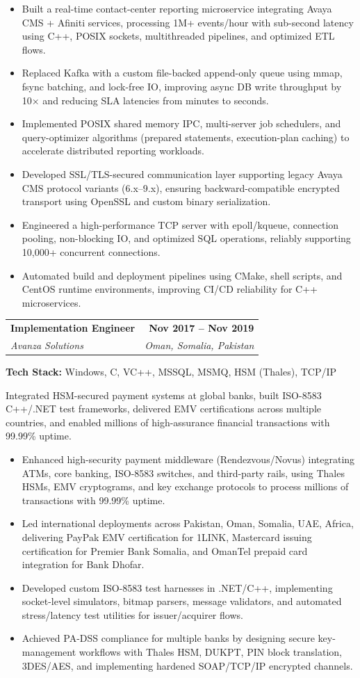 \documentclass[letterpaper,11pt]{article}
\makeatletter
\newcommand{\resumeItem}[1]{
  \item\small{
    {#1 \vspace{-2pt}}
  }
}
\newcommand{\resumeJobHeading}[4]{
  \vspace{-2pt}\item
    \begin{tabular*}{0.97\textwidth}[t]{l@{\extracolsep{\fill}}r}
      \textbf{#1} & \textbf{#2} \\
      \textit{\small#3} & \textit{\small #4} \\
    \end{tabular*}\vspace{5pt}
}
\newcommand{\resumeItemListStart}{\begin{itemize}}
\newcommand{\resumeItemListEnd}{\end{itemize}\vspace{-5pt}}
\makeatother
\begin{document}
      \resumeItemListStart
        \resumeItem{Built a real-time contact-center reporting microservice integrating Avaya CMS + Afiniti services, processing 1M+ events/hour with sub-second latency using C++, POSIX sockets, multithreaded pipelines, and optimized ETL flows.}
        \resumeItem{Replaced Kafka with a custom file-backed append-only queue using mmap, fsync batching, and lock-free IO, improving async DB write throughput by 10× and reducing SLA latencies from minutes to seconds.}
        \resumeItem{Implemented POSIX shared memory IPC, multi-server job schedulers, and query-optimizer algorithms (prepared statements, execution-plan caching) to accelerate distributed reporting workloads.}
        \resumeItem{Developed SSL/TLS-secured communication layer supporting legacy Avaya CMS protocol variants (6.x–9.x), ensuring backward-compatible encrypted transport using OpenSSL and custom binary serialization.}
        \resumeItem{Engineered a high-performance TCP server with epoll/kqueue, connection pooling, non-blocking IO, and optimized SQL operations, reliably supporting 10,000+ concurrent connections.}
        \resumeItem{Automated build and deployment pipelines using CMake, shell scripts, and CentOS runtime environments, improving CI/CD reliability for C++ microservices.}
      \resumeItemListEnd
      \vspace{10pt}

    \resumeJobHeading
      {Implementation Engineer}{Nov 2017 -- Nov 2019}
      {Avanza Solutions}{Oman, Somalia, Pakistan}
      
      \textbf{Tech Stack:} Windows, C, VC++, MSSQL, MSMQ, HSM (Thales), TCP/IP
      
      \vspace{3pt}
      \small{Integrated HSM-secured payment systems at global banks, built ISO-8583 C++/.NET test frameworks, delivered EMV certifications across multiple countries, and enabled millions of high-assurance financial transactions with 99.99\% uptime.}
      
      \resumeItemListStart
        \resumeItem{Enhanced high-security payment middleware (Rendezvous/Novus) integrating ATMs, core banking, ISO-8583 switches, and third-party rails, using Thales HSMs, EMV cryptograms, and key exchange protocols to process millions of transactions with 99.99\% uptime.}
        \resumeItem{Led international deployments across Pakistan, Oman, Somalia, UAE, Africa, delivering PayPak EMV certification for 1LINK, Mastercard issuing certification for Premier Bank Somalia, and OmanTel prepaid card integration for Bank Dhofar.}
        \resumeItem{Developed custom ISO-8583 test harnesses in .NET/C++, implementing socket-level simulators, bitmap parsers, message validators, and automated stress/latency test utilities for issuer/acquirer flows.}
        \resumeItem{Achieved PA-DSS compliance for multiple banks by designing secure key-management workflows with Thales HSM, DUKPT, PIN block translation, 3DES/AES, and implementing hardened SOAP/TCP/IP encrypted channels.}
      \resumeItemListEnd
      \vspace{10pt}
\end{document}
